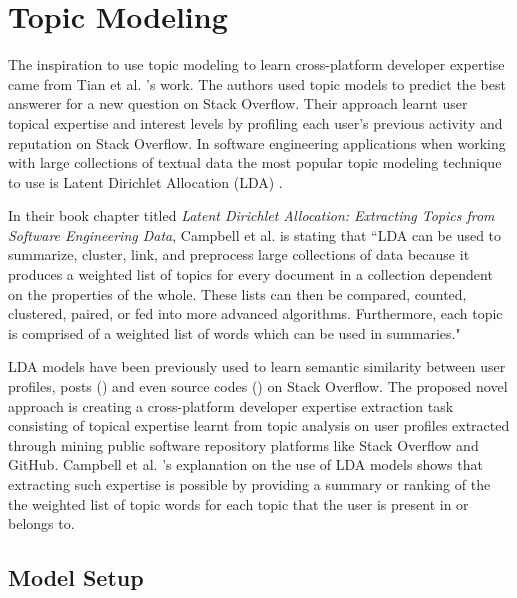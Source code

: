 \section{Topic Modeling\label{topic_modeling}}

    The inspiration to use topic modeling to learn cross-platform developer expertise came from Tian et al. \cite{tian2013predicting}'s work. The authors used topic models to predict the best answerer for a new question on Stack Overflow. Their approach learnt user topical expertise and interest levels by profiling each user's previous activity and reputation on Stack Overflow. In software engineering applications when working with large collections of textual data the most popular topic modeling technique to use is Latent Dirichlet Allocation (LDA) \cite{campbell2015latent}. 
    
    In their book chapter titled \textit{Latent Dirichlet Allocation: Extracting Topics from Software Engineering Data}, Campbell et al. \cite{campbell2015latent} is stating that ``LDA can be used to summarize, cluster, link, and preprocess large collections of data because it produces a weighted list of topics for every document in a collection dependent on the properties of the whole. These lists can then be compared, counted, clustered, paired, or fed into more advanced algorithms. Furthermore, each topic is comprised of a weighted list of words which can be used in summaries."
    
    LDA models have been previously used to learn semantic similarity between user profiles, posts (\cite{tian2013predicting}) and even source codes (\cite{arwan2015source}) on Stack Overflow. The proposed novel approach is creating a cross-platform developer expertise extraction task consisting of topical expertise learnt from topic analysis on user profiles extracted through mining public software repository platforms like Stack Overflow and GitHub. Campbell et al. \cite{campbell2015latent}'s explanation on the use of LDA models shows that extracting such expertise is possible by providing a summary or ranking of the the weighted list of topic words for each topic that the user is present in or belongs to. 
        
    \subsection{Model Setup \label{activeUser_Def}}
    
